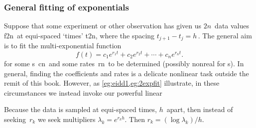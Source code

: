 \subsubsection{General fitting of exponentials}

Suppose that some experiment or other observation has given us \(2n\)~data values \hlist f{2n}\ at equi-spaced `times' \hlist t{2n}, where the spacing \(t_{j+1}-t_j=h\)\,.
The general aim is to fit the multi-exponential function \cite[\S2.6, e.g.]{Cuyt2015}
\begin{equation}
f(t)=c_1e^{r_1t}+c_2e^{r_2t}+\cdots+c_ne^{r_nt}.
\label{eq:eiddse}
\end{equation}
for some s~\hlist cn\ and some rates~\hlist rn\ to be determined (possibly nonreal  for s).
In general, finding the coefficients and rates is a delicate nonlinear task outside the remit of this book.
However, as \cref{eg:eidd1,eg:2expfit} illustrate, in these circumstances we instead invoke our powerful linear 

Because the data is sampled at equi-spaced times, \(h\)~apart, then instead of seeking~\(r_k\) we seek multipliers \(\lambda_k=e^{r_kh}\).
Then \(r_k=(\log\lambda_k)/h\).

